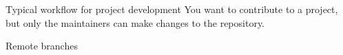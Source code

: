\documentclass[svgnames]{beamer}
\begin{document}
\begin{frame}{Typical workflow for project development}
  You want to contribute to a project, but only the maintainers
	can make changes to the repository.

 \vspace{0.3truecm}
\end{frame}

\begin{frame}{Remote branches}
\end{frame}
\end{document}
